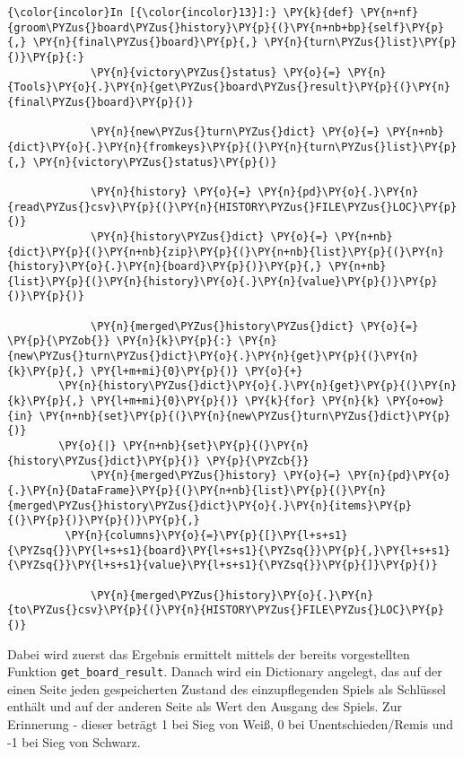     \begin{Verbatim}[commandchars=\\\{\}]
{\color{incolor}In [{\color{incolor}13}]:} \PY{k}{def} \PY{n+nf}{groom\PYZus{}board\PYZus{}history}\PY{p}{(}\PY{n+nb+bp}{self}\PY{p}{,} \PY{n}{final\PYZus{}board}\PY{p}{,} \PY{n}{turn\PYZus{}list}\PY{p}{)}\PY{p}{:}
             \PY{n}{victory\PYZus{}status} \PY{o}{=} \PY{n}{Tools}\PY{o}{.}\PY{n}{get\PYZus{}board\PYZus{}result}\PY{p}{(}\PY{n}{final\PYZus{}board}\PY{p}{)}
         
             \PY{n}{new\PYZus{}turn\PYZus{}dict} \PY{o}{=} \PY{n+nb}{dict}\PY{o}{.}\PY{n}{fromkeys}\PY{p}{(}\PY{n}{turn\PYZus{}list}\PY{p}{,} \PY{n}{victory\PYZus{}status}\PY{p}{)}
         
             \PY{n}{history} \PY{o}{=} \PY{n}{pd}\PY{o}{.}\PY{n}{read\PYZus{}csv}\PY{p}{(}\PY{n}{HISTORY\PYZus{}FILE\PYZus{}LOC}\PY{p}{)}
             \PY{n}{history\PYZus{}dict} \PY{o}{=} \PY{n+nb}{dict}\PY{p}{(}\PY{n+nb}{zip}\PY{p}{(}\PY{n+nb}{list}\PY{p}{(}\PY{n}{history}\PY{o}{.}\PY{n}{board}\PY{p}{)}\PY{p}{,} \PY{n+nb}{list}\PY{p}{(}\PY{n}{history}\PY{o}{.}\PY{n}{value}\PY{p}{)}\PY{p}{)}\PY{p}{)}
         
             \PY{n}{merged\PYZus{}history\PYZus{}dict} \PY{o}{=} \PY{p}{\PYZob{}} \PY{n}{k}\PY{p}{:} \PY{n}{new\PYZus{}turn\PYZus{}dict}\PY{o}{.}\PY{n}{get}\PY{p}{(}\PY{n}{k}\PY{p}{,} \PY{l+m+mi}{0}\PY{p}{)} \PY{o}{+} 
		\PY{n}{history\PYZus{}dict}\PY{o}{.}\PY{n}{get}\PY{p}{(}\PY{n}{k}\PY{p}{,} \PY{l+m+mi}{0}\PY{p}{)} \PY{k}{for} \PY{n}{k} \PY{o+ow}{in} \PY{n+nb}{set}\PY{p}{(}\PY{n}{new\PYZus{}turn\PYZus{}dict}\PY{p}{)} 
		\PY{o}{|} \PY{n+nb}{set}\PY{p}{(}\PY{n}{history\PYZus{}dict}\PY{p}{)} \PY{p}{\PYZcb{}}
             \PY{n}{merged\PYZus{}history} \PY{o}{=} \PY{n}{pd}\PY{o}{.}\PY{n}{DataFrame}\PY{p}{(}\PY{n+nb}{list}\PY{p}{(}\PY{n}{merged\PYZus{}history\PYZus{}dict}\PY{o}{.}\PY{n}{items}\PY{p}{(}\PY{p}{)}\PY{p}{)}\PY{p}{,}
		 \PY{n}{columns}\PY{o}{=}\PY{p}{[}\PY{l+s+s1}{\PYZsq{}}\PY{l+s+s1}{board}\PY{l+s+s1}{\PYZsq{}}\PY{p}{,}\PY{l+s+s1}{\PYZsq{}}\PY{l+s+s1}{value}\PY{l+s+s1}{\PYZsq{}}\PY{p}{]}\PY{p}{)}
         
             \PY{n}{merged\PYZus{}history}\PY{o}{.}\PY{n}{to\PYZus{}csv}\PY{p}{(}\PY{n}{HISTORY\PYZus{}FILE\PYZus{}LOC}\PY{p}{)}
\end{Verbatim}

    Dabei wird zuerst das Ergebnis ermittelt mittels der bereits
vorgestellten Funktion \texttt{get\_board\_result}. Danach wird ein
Dictionary angelegt, das auf der einen Seite jeden gespeicherten Zustand
des einzupflegenden Spiels als Schlüssel enthält und auf der anderen
Seite als Wert den Ausgang des Spiels. Zur Erinnerung - dieser beträgt 1
bei Sieg von Weiß, 0 bei Unentschieden/Remis und -1 bei Sieg von Schwarz.

